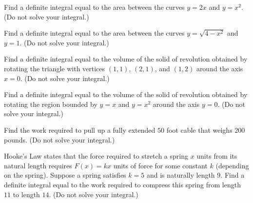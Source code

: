 \documentclass[12pt]{article}
\begin{document}

Find a definite integral equal to the area between the curves
\(y=2x\) and \(y=x^2\).
(Do not solve your integral.)


Find a definite integral equal to the area between the curves
\(y=\sqrt{4-x^2}\) and \(y=1\).
(Do not solve your integral.)




Find a definite integral equal to the volume of
the solid of revolution obtained by rotating
the triangle with vertices \((1,1)\), \((2,1)\), and \((1,2)\) around the
axis \(x=0\).
(Do not solve your integral.)


Find a definite integral equal to the volume of
the solid of revolution obtained by rotating
the region bounded by \(y=x\) and \(y=x^2\) around the
axis \(y=0\).
(Do not solve your integral.)

\newpage






Find the work required to pull up a fully extended \(50\) foot cable
that weighs \(200\) pounds.
(Do not solve your integral.)


Hooke's Law states that the force required to stretch a spring \(x\) units
from its natural length requires \(F(x)=kx\) units of force for some
constant \(k\) (depending on the spring). Suppose a spring satisfies
\(k=5\) and is naturally length \(9\). Find a definite integral equal
to the work required to compress
this spring from length \(11\) to length \(14\).
(Do not solve your integral.)



\end{document}
